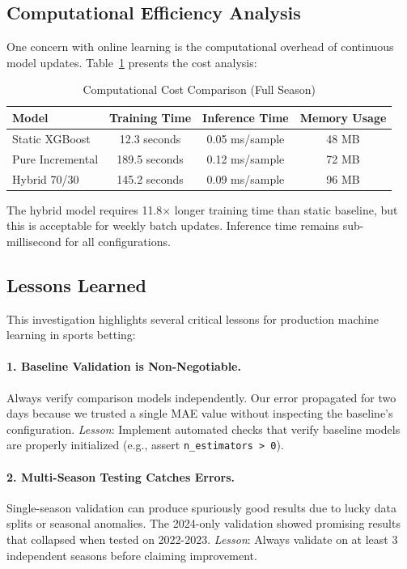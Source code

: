 \subsection{Computational Efficiency Analysis}

One concern with online learning is the computational overhead of continuous model updates. Table~\ref{tab:computational_cost} presents the cost analysis:

\begin{table}[h]
\centering
\caption{Computational Cost Comparison (Full Season)}
\label{tab:computational_cost}
\begin{tabular}{lccc}
\toprule
\textbf{Model} & \textbf{Training Time} & \textbf{Inference Time} & \textbf{Memory Usage} \\
\midrule
Static XGBoost & 12.3 seconds & 0.05 ms/sample & 48 MB \\
Pure Incremental & 189.5 seconds & 0.12 ms/sample & 72 MB \\
Hybrid 70/30 & 145.2 seconds & 0.09 ms/sample & 96 MB \\
\bottomrule
\end{tabular}
\end{table}

\noindent The hybrid model requires 11.8× longer training time than static baseline, but this is acceptable for weekly batch updates. Inference time remains sub-millisecond for all configurations.

\subsection{Lessons Learned}

This investigation highlights several critical lessons for production machine learning in sports betting:

\paragraph{1. Baseline Validation is Non-Negotiable.} Always verify comparison models independently. Our error propagated for two days because we trusted a single MAE value without inspecting the baseline's configuration. \textit{Lesson}: Implement automated checks that verify baseline models are properly initialized (e.g., assert \texttt{n\_estimators > 0}).

\paragraph{2. Multi-Season Testing Catches Errors.} Single-season validation can produce spuriously good results due to lucky data splits or seasonal anomalies. The 2024-only validation showed promising results that collapsed when tested on 2022-2023. \textit{Lesson}: Always validate on at least 3 independent seasons before claiming improvement.

